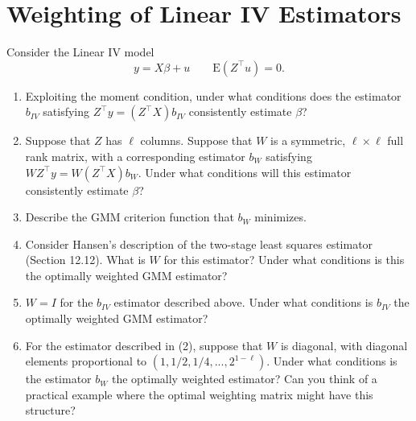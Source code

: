 \documentclass[12pt]{amsart}
\newcommand{\T}{\top}
\newcommand{\E}{\ensuremath{\mbox{E}}}
\begin{document}
\section{Weighting of Linear IV Estimators}
\label{sec:orgeb9d69d}
Consider the Linear IV model
\[
      y = X\beta + u\qquad \E(Z^\T u)=0.
  \]
\begin{enumerate}
\item Exploiting the moment condition, under what conditions does the
estimator \(b_{IV}\) satisfying \(Z^\T y = (Z^\T X)b_{IV}\)
consistently estimate \(\beta\)?
\item Suppose that \(Z\) has \(\ell\) columns.  Suppose that \(W\) is a symmetric,
\(\ell\times\ell\) full rank matrix, with a corresponding estimator \(b_W\)
satisfying \(WZ^\T y = W(Z^\T X)b_{W}\).  Under what conditions
will this estimator consistently estimate \(\beta\)?
\item Describe the GMM criterion function that \(b_W\) minimizes.
\item Consider Hansen's description of the two-stage least squares
estimator (Section 12.12).  What is \(W\) for this estimator?
Under what conditions is this the optimally weighted GMM estimator?
\item \(W=I\) for the \(b_{IV}\) estimator described above.  Under what
conditions is \(b_{IV}\) the optimally weighted GMM estimator?
\item For the estimator described in (2), suppose that \(W\) is diagonal,
with diagonal elements proportional to
\((1,1/2,1/4,...,2^{1-\ell})\).  Under what conditions is the
estimator \(b_W\) the optimally weighted estimator?  Can you think
of a practical example where the optimal weighting matrix might
have this structure?
\end{enumerate}


\printbibliography
\end{document}
